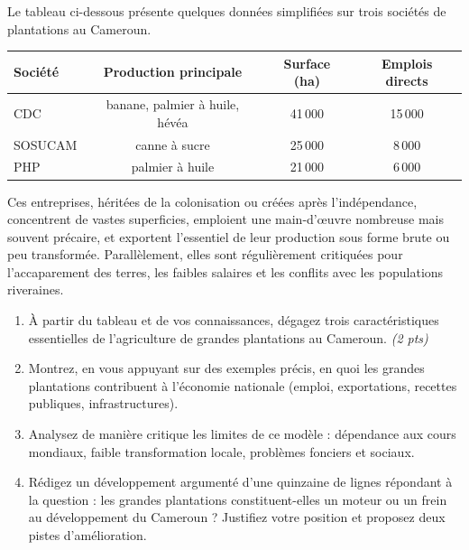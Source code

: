 \documentclass[11pt]{article}
\begin{document}
\begin{exercice}
Le tableau ci-dessous présente quelques données simplifiées sur trois sociétés de plantations au Cameroun.

\begin{center}
\begin{tabular}{|l|c|c|c|}
\hline
\textbf{Société} & \textbf{Production principale} & \textbf{Surface (ha)} & \textbf{Emplois directs} \\
\hline
CDC & banane, palmier à huile, hévéa & 41\,000 & 15\,000 \\
\hline
SOSUCAM & canne à sucre & 25\,000 & 8\,000 \\
\hline
PHP & palmier à huile & 21\,000 & 6\,000 \\
\hline
\end{tabular}
\end{center}

Ces entreprises, héritées de la colonisation ou créées après l'indépendance, concentrent de vastes superficies, emploient une main-d'\oe uvre nombreuse mais souvent précaire, et exportent l'essentiel de leur production sous forme brute ou peu transformée. Parallèlement, elles sont régulièrement critiquées pour l'accaparement des terres, les faibles salaires et les conflits avec les populations riveraines.

\begin{enumerate}
\item À partir du tableau et de vos connaissances, dégagez trois caractéristiques essentielles de l'agriculture de grandes plantations au Cameroun. \textit{(2 pts)}
\item Montrez, en vous appuyant sur des exemples précis, en quoi les grandes plantations contribuent à l'économie nationale (emploi, exportations, recettes publiques, infrastructures).
\item Analysez de manière critique les limites de ce modèle : dépendance aux cours mondiaux, faible transformation locale, problèmes fonciers et sociaux.
\item Rédigez un développement argumenté d'une quinzaine de lignes répondant à la question : les grandes plantations constituent-elles un moteur ou un frein au développement du Cameroun ? Justifiez votre position et proposez deux pistes d'amélioration.
\end{enumerate}
\end{exercice}
\end{document}
